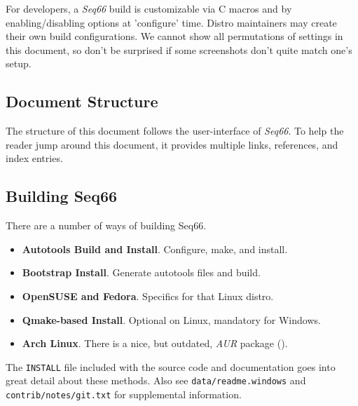 \documentclass[
 11pt,
 twoside,
 a4paper,
 final                                 %
]{article}
\begin{document}
   For developers, a \textsl{Seq66} build is customizable via C macros and by
   enabling/disabling options at 'configure' time.
   Distro maintainers may create their own build configurations.
   We cannot show all permutations of settings in this document,
   so don't be surprised if some screenshots don't quite match one's setup.

\subsection{Document Structure}
\label{subsec:introduction_document_structure}

   The structure of this document follows the user-interface of
   \textsl{Seq66}.
   To help the reader jump around this document, it provides
   multiple links, references, and index entries.

\subsection{Building Seq66}
\label{subsec:introduction_building_seq66}

   There are a number of ways of building Seq66.

   \begin{itemize}
      \item \textbf{Autotools Build and Install}.
         Configure, make, and install.
      \item \textbf{Bootstrap Install}.
         Generate autotools files and build.
      \item \textbf{OpenSUSE and Fedora}.
         Specifics for that Linux distro.
      \item \textbf{Qmake-based Install}.
         Optional on Linux, mandatory for Windows.
      \item \textbf{Arch Linux}.
         There is a nice, but outdated, \textsl{AUR} package (\cite{AUR}).
   \end{itemize}

   The \texttt{INSTALL} file included with the source code and
   documentation goes into great detail about these methods.
   Also see \texttt{data/readme.windows} and \texttt{contrib/notes/git.txt}
   for supplemental information.







\end{document}

